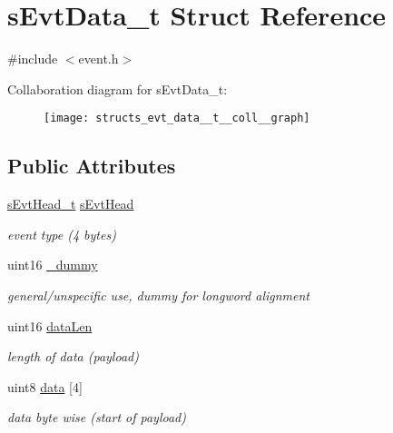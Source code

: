 \hypertarget{structs_evt_data__t}{}\section{s\+Evt\+Data\+\_\+t Struct Reference}
\label{structs_evt_data__t}


{\ttfamily \#include $<$event.\+h$>$}



Collaboration diagram for s\+Evt\+Data\+\_\+t\+:\nopagebreak
\begin{figure}[H]
\begin{center}
\leavevmode
\texttt{[image: structs\_evt\_data\_\_t\_\_coll\_\_graph]}
\end{center}
\end{figure}
\subsection*{Public Attributes}
\begin{DoxyCompactItemize}
\item 
\mbox{\label{structs_evt_data__t_afdd6d7dd093bd1e7fb0e8119631f3385}} 
\mbox{\hyperlink{structs_evt_head__t}{s\+Evt\+Head\+\_\+t}} \mbox{\hyperlink{structs_evt_data__t_afdd6d7dd093bd1e7fb0e8119631f3385}{s\+Evt\+Head}}
\begin{DoxyCompactList}\small\item\em event type (4 bytes) \end{DoxyCompactList}\item 
\mbox{\label{structs_evt_data__t_a9f33afe0b148629f63cf3c24618bc759}} 
uint16 \mbox{\hyperlink{structs_evt_data__t_a9f33afe0b148629f63cf3c24618bc759}{\+\_\+dummy}}
\begin{DoxyCompactList}\small\item\em general/unspecific use, dummy for longword alignment \end{DoxyCompactList}\item 
\mbox{\label{structs_evt_data__t_abc91f27ad97034aca5751f6c8c14efd2}} 
uint16 \mbox{\hyperlink{structs_evt_data__t_abc91f27ad97034aca5751f6c8c14efd2}{data\+Len}}
\begin{DoxyCompactList}\small\item\em length of data (payload) \end{DoxyCompactList}\item 
\mbox{\label{structs_evt_data__t_a4e7efc3ffcec18a6b18c276764443687}} 
uint8 \mbox{\hyperlink{structs_evt_data__t_a4e7efc3ffcec18a6b18c276764443687}{data}} \mbox{[}4\mbox{]}
\begin{DoxyCompactList}\small\item\em data byte wise (start of payload) \end{DoxyCompactList}\end{DoxyCompactItemize}


